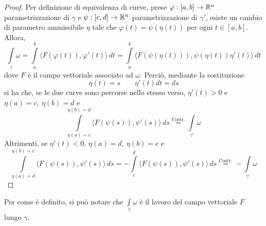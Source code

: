 \begin{proof}
    Per definizione di equivalenza di curve, prese 
    $\varphi: [a, b] \to \mathbb{R}^n$ parametrizzazione di $\gamma$ e $\psi:[c,d] \to \mathbb{R}^n$ parametrizzazione di $\gamma'$,  esiste un cambio di parametro ammissibile $\eta$ tale che $\varphi(t)= \psi(\eta(t))$ per ogni $t \in [a,b]$. Allora, 
    \begin{equation*}
        \int\limits_\gamma {\omega}= \int\limits_{a}^{b}{\langle F(\varphi(t)), \varphi'(t) \rangle}\, dt = \int\limits_{a}^{b}{ \langle F(\psi(\eta(t))), \psi(\eta(t))\eta'(t)\rangle}\, dt
    \end{equation*}
    dove $F$ è il campo vettoriale associato ad $\omega$.
    Perciò, mediante la sostituzione
    \begin{equation*}
        \eta(t)=s \qquad \eta'(t)dt =ds
    \end{equation*}
    si ha che, se le due curve sono percorse nello stesso verso, $\eta'(t) >0 $ e $\eta(a)=c,\ \eta(b)=d$ e
    \begin{equation*}
    \int\limits_{\eta(a)=c}^{\eta(b)=d}{ \langle F(\psi(s)), \psi'(s)\rangle}\, ds \overset{\text{Costr.}}{=} \int\limits_{\gamma'}{\omega} 
    \end{equation*}
    Altrimenti, se $\eta'(t) < 0 $,  $\eta(a)=d,\ \eta(b)=c$ e 
    \begin{equation*}
     \int\limits_{\eta(a)=d}^{\eta(b)=c}{ \langle F(\psi(s)), \psi'(s)\rangle}\, ds = - \int\limits_{c}^{d}{\langle F(\psi(s)), \psi'(s)\rangle}\, ds\overset{\text{Costr.}}{=} -\int\limits_{\gamma'}{\omega} 
    \end{equation*}
\end{proof}
\begin{oss}
    Per come è definito, si può notare che $\int\limits_{\gamma}{\omega}$ è il lavoro del campo vettoriale $F$ lungo $\gamma$.
\end{oss}

